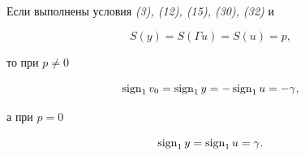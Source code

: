 \begin{thm}


Если выполнены условия {\em (3), (12), (15), (30), (32)} и


\begin{equation}


S(y)=S(\Gamma u)=S(u)=p,


\end{equation}


то при $p\ne 0$


\begin{equation}


\sign_1v_0=\sign_1y=-\sign_1u=-\gamma,


\end{equation}


а при $p=0$


\begin{equation}


\sign_1y=\sign_1u=\gamma.


\end{equation}


\end{thm}








